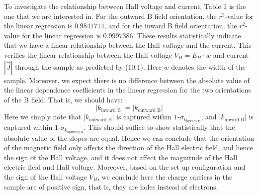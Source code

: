 \documentclass[11pt]{book}
\theoremstyle{break}
\theoremstyle{break}
\begin{document}
To investigate the relationship between Hall voltage and current, Table 1 is the one that we are interested in. For the outward B field orientation, the $r^2$-value for the linear regression is $0.9841714$, and for the inward B field orientation, the $r^2$-value for the linear regression is $0.9997386$. These results statistically indicate that we have a linear relationship between the Hall voltage and the current. This verifies the linear relationship between the Hall voltage $V_H = E_H \cdot w$ and current $|\vec{J}|$ through the sample as predicted by (10.1). Here $w$ denotes the width of the sample. Moreover, we expect there is no difference between the absolute value of the linear dependence coefficients in the linear regression for the two orientations of the B field. That is, we should have: $$|k_{\text{inward B}}| = |k_{\text{outward B}}|$$
Here we simply note that $|k_{\text{outward B}}|$ is captured within $1$-$\sigma_{k_{\text{inward B}}}$, and $|k_{\text{inward B}}|$ is captured within $1$-$\sigma_{k_{\text{outward B}}}$. This should suffice to show statistically that the absolute value of the slopes are equal. Hence we can conclude that the orientation of the magnetic field only affects the direction of the Hall electric field, and hence the sign of the Hall voltage, and it does not affect the magnitude of the Hall electric field and Hall voltage. Moreover, based on the set up configuration and the sign of the Hall voltage $V_H$, we conclude here the charge carriers in the sample are of positive sign, that is, they are holes instead of electrons. \\
\end{document}
